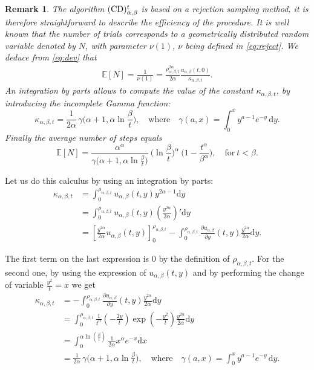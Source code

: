 \documentclass[12pt]{article}
\newcommand{\ds}{\displaystyle}
\newcommand{\dint}{\mathrm{d}}
\newtheorem{rem}[thm]{Remark}
\numberwithin{equation}{section}
\begin{document}
\begin{rem}
\label{rem:efficiency}
The algorithm $({\rm CD})^t_{\alpha,\beta}$ is based on a rejection sampling method, it is therefore straightforward to describe the efficiency of the procedure. It is well known that the number of trials corresponds to a geometrically distributed random variable denoted by $N$, with parameter $\nu(1)$, $\nu$ being defined in \eqref{eq:reject}. We deduce from \eqref{eq:dev} that
\begin{align*}
\mathbb{E}[N]=\frac{1}{\nu(1)}=\frac{\rho_{\alpha,\beta,t}^{2\alpha}}{2\alpha}\frac{u_{\alpha,\beta}(t,0)}{\kappa_{\alpha,\beta,t}}.
\end{align*}
An integration by parts allows to compute the value of the constant $\kappa_{\alpha,\beta,t}$, by introducing the incomplete Gamma function:
\[
\kappa_{\alpha,\beta,t}=\frac{1}{2\alpha}\,\gamma\Big(\alpha+1,\alpha\ln\frac{\beta}{t}\Big),\quad\mbox{where}\quad \gamma(a,x)=\int_0^x y^{a-1}e^{-y}\,\dint y.
\]
Finally the average number of steps equals
\[
\mathbb{E}[N]=\frac{\alpha^\alpha}{\gamma\Big(\alpha+1,\alpha\ln\frac{\beta}{t}\Big)}\ \Big(\ln\frac{\beta}{t}\Big)^\alpha\ \Big(1 - \frac{t^\alpha}{\beta^\alpha}  \Big),\quad \mbox{for}\ t<\beta.    
\]
\end{rem}
\begin{Calculus} Let us do this calculus by using an integration by parts:
\[
\begin{array}{ll}
\kappa_{\alpha,\beta,t}& = \ds\int_0^{\rho_{\alpha,\beta,t}} u_{\alpha,\beta}(t,y)y^{2\alpha-1}\dint y\\
&=\ds\int_0^{\rho_{\alpha,\beta,t}} u_{\alpha,\beta}(t,y)\left(\frac{y^{2\alpha}}{2\alpha}\right)'\dint y\\
&= \left[\ds\frac{y^{2\alpha}}{2\alpha}u_{\alpha, \beta}(t,y)\right]_0^{\rho_{\alpha,\beta,t}} - \ds\int_0^{\rho_{\alpha,\beta,t}} \ds\frac{\partial u_{\alpha,\beta}}{\partial y} (t,y) \ds\frac{y^{2\alpha}}{2\alpha}\dint y.
\end{array}
\]

The first term on the last expression is 0 by the definition of $\rho_{\alpha,\beta,t}$. For the second one, by using the expression of $u_{\alpha,\beta}(t,y)$ and by performing the change of variable $\frac{y^2}{t}=x$ we get
\[
\begin{array}{ll}
\kappa_{\alpha,\beta,t}& = - \ds\int_0^{\rho_{\alpha,\beta,t}} \ds\frac{\partial u_{\alpha,\beta}}{\partial y} (t,y) \ds\frac{y^{2\alpha}}{2\alpha}\dint y\\
&=\ds\int_0^{\rho_{\alpha,\beta,t}}\ds\frac{1}{t^\alpha} \left(-\frac{2y}{t}\right)\exp\left(-\frac{y^2}{t}\right) \ds\frac{y^{2\alpha}}{2\alpha}\dint y\\
&= \ds\int_0^{\alpha \ln(\frac{\beta}{t})} \frac{1}{2\alpha} x^\alpha e^{-x}\dint x\\ 
&=
\ds\frac{1}{2\alpha}\,\gamma\Big(\alpha+1,\alpha\ln\frac{\beta}{t}\Big),\quad\mbox{where}\quad \gamma(a,x)=\int_0^x y^{a-1}e^{-y}\,\dint y.
\end{array}
\]
\end{Calculus}
\end{document}
